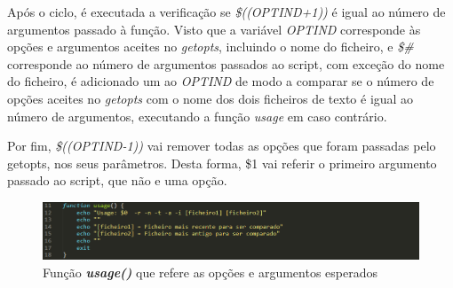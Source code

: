 \documentclass[10pt,portuguese]{article}
\begin{document}
\par Após o ciclo, é executada a verificação se \textit{\$((OPTIND+1))} é igual ao número de argumentos passado à função. Visto que a variável \textit{OPTIND} corresponde às opções e argumentos aceites no \textit{getopts}, incluindo o nome do ficheiro, e \textit{\$\#} corresponde ao número de argumentos passados ao script, com exceção do nome do ficheiro, é adicionado um ao \textit{OPTIND} de modo a comparar se o número de opções aceites no \textit{getopts} com o nome dos dois ficheiros de texto é igual ao número de argumentos, executando a função \textit{usage} em caso contrário.
\par Por fim, \textit{\$((OPTIND-1))} vai remover todas as opções que foram passadas pelo getopts, nos seus parâmetros. Desta forma, \$1 vai referir o primeiro argumento passado ao script, que não e uma opção.

\begin{figure}[!h]
    \centering
    \includegraphics[width=\textwidth]{comparestats/usage_c.png}
    \caption{Função \textbf{\textit{usage()}} que refere as opções e argumentos esperados}
\end{figure}

\clearpage
\end{document}
